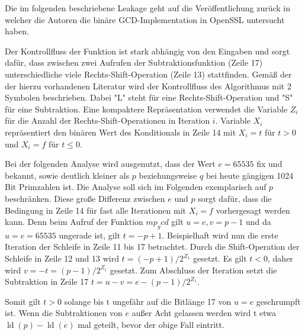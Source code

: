 Die im folgenden beschriebene Leakage geht auf die Veröffentlichung \cite{RSAKeyGeneration2} zurück in welcher die Autoren die binäre GCD-Implementation in OpenSSL untersucht haben.

Der Kontrollfluss der Funktion ist stark abhängig von den Eingaben und sorgt dafür, dass zwischen zwei Aufrufen der Subtraktionsfunktion (Zeile 17) unterschiedliche viele Rechts-Shift-Operation (Zeile 13) stattfinden.
Gemäß der der hierzu vorhandenen Literatur wird der Kontrollfluss des Algorithmus mit 2 Symbolen beschrieben.
Dabei "L" steht für eine Rechts-Shift-Operation und "S" für eine Subtraktion.
Eine kompaktere Repräsentation verwendet die Variable $Z_i$ für die Anzahl der Rechts-Shift-Operationen in Iteration $i$.
Variable $X_i$ repräsentiert den binären Wert des Konditionals in Zeile 14 mit $X_i=t$ für $t>0$ und $X_i = f$ für $t \leq 0$.

Bei der folgenden Analyse wird ausgenutzt, dass der Wert $e=65535$ fix und bekannt, sowie deutlich kleiner als $p$ beziehungsweise $q$ bei heute gängigen 1024 Bit Primzahlen ist.
Die Analyse soll sich im Folgenden exemplarisch auf $p$ beschränken.
Diese große Differenz zwischen $e$ und $p$ sorgt dafür, dass die Bedingung in Zeile 14 für fast alle Iterationen mit $X_i = f$ vorhergesagt werden kann.
Denn beim Aufruf der Funktion $mp_gcd$ gilt $u=e, v=p-1$ und da $u=e=65535$ ungerade ist, gilt $t=-p+1$.
Beispielhaft wird nun die erste Iteration der Schleife in Zeile 11 bis 17 betrachtet.
Durch die Shift-Operation der Schleife in Zeile 12 und 13 wird $t=(-p+1)/2^{Z_1}$ gesetzt.
Es gilt $t<0$, daher wird $v=-t=(p-1)/2^{Z_1}$ gesetzt. 
Zum Abschluss der Iteration setzt die Subtraktion in Zeile 17 $t=u-v=e-(p-1)/2^{Z_1}$.

Somit gilt $t>0$ solange bis t ungefähr auf die Bitlänge 17 von $u=e$ geschrumpft ist.
Wenn die Subtraktionen von $e$ außer Acht gelassen werden wird t etwa $\operatorname{ld}(p) - \operatorname{ld}(e)$ mal geteilt, bevor der obige Fall eintritt.

